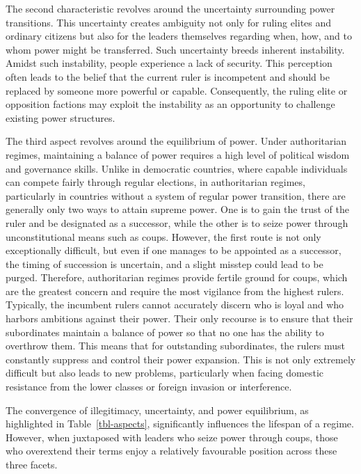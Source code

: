 \documentclass[
  12pt,
  a4paper,
  12pt]{article}
\begin{document}
The second characteristic revolves around the uncertainty surrounding
power transitions. This uncertainty creates ambiguity not only for
ruling elites and ordinary citizens but also for the leaders themselves
regarding when, how, and to whom power might be transferred. Such
uncertainty breeds inherent instability. Amidst such instability, people
experience a lack of security. This perception often leads to the belief
that the current ruler is incompetent and should be replaced by someone
more powerful or capable. Consequently, the ruling elite or opposition
factions may exploit the instability as an opportunity to challenge
existing power structures.

The third aspect revolves around the equilibrium of power. Under
authoritarian regimes, maintaining a balance of power requires a high
level of political wisdom and governance skills. Unlike in democratic
countries, where capable individuals can compete fairly through regular
elections, in authoritarian regimes, particularly in countries without a
system of regular power transition, there are generally only two ways to
attain supreme power. One is to gain the trust of the ruler and be
designated as a successor, while the other is to seize power through
unconstitutional means such as coups. However, the first route is not
only exceptionally difficult, but even if one manages to be appointed as
a successor, the timing of succession is uncertain, and a slight misstep
could lead to be purged. Therefore, authoritarian regimes provide
fertile ground for coups, which are the greatest concern and require the
most vigilance from the highest rulers. Typically, the incumbent rulers
cannot accurately discern who is loyal and who harbors ambitions against
their power. Their only recourse is to ensure that their subordinates
maintain a balance of power so that no one has the ability to overthrow
them. This means that for outstanding subordinates, the rulers must
constantly suppress and control their power expansion. This is not only
extremely difficult but also leads to new problems, particularly when
facing domestic resistance from the lower classes or foreign invasion or
interference.

The convergence of illegitimacy, uncertainty, and power equilibrium, as
highlighted in Table~\ref{tbl-aspects}, significantly influences the
lifespan of a regime. However, when juxtaposed with leaders who seize
power through coups, those who overextend their terms enjoy a relatively
favourable position across these three facets.
\end{document}
